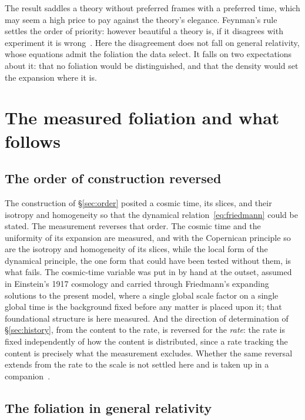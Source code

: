 \documentclass[11pt,a4paper]{article}
\begin{document}
The result saddles a theory without preferred frames with a preferred time, which may seem a high price to pay against the theory's elegance. Feynman's rule settles the order of priority: however beautiful a theory is, if it disagrees with experiment it is wrong~\cite{Feynman1965}. Here the disagreement does not fall on general relativity, whose equations admit the foliation the data select. It falls on two expectations about it: that no foliation would be distinguished, and that the density would set the expansion where it is.

\section{The measured foliation and what follows}\label{sec:follows}

\subsection{The order of construction reversed}\label{sec:reversed}

The construction of \S\ref{sec:order} posited a cosmic time, its slices, and their isotropy and homogeneity so that the dynamical relation~\eqref{eq:friedmann} could be stated. The measurement reverses that order. The cosmic time and the uniformity of its expansion are measured, and with the Copernican principle so are the isotropy and homogeneity of its slices, while the local form of the dynamical principle, the one form that could have been tested without them, is what fails. The cosmic-time variable was put in by hand at the outset, assumed in Einstein's 1917 cosmology and carried through Friedmann's expanding solutions to the present model, where a single global scale factor on a single global time is the background fixed before any matter is placed upon it; that foundational structure is here measured. And the direction of determination of \S\ref{sec:history}, from the content to the rate, is reversed for the \emph{rate}: the rate is fixed independently of how the content is distributed, since a rate tracking the content is precisely what the measurement excludes. Whether the same reversal extends from the rate to the scale is not settled here and is taken up in a companion~\cite{JanzenCRframework}.

\subsection{The foliation in general relativity}\label{sec:foliation}
\end{document}
